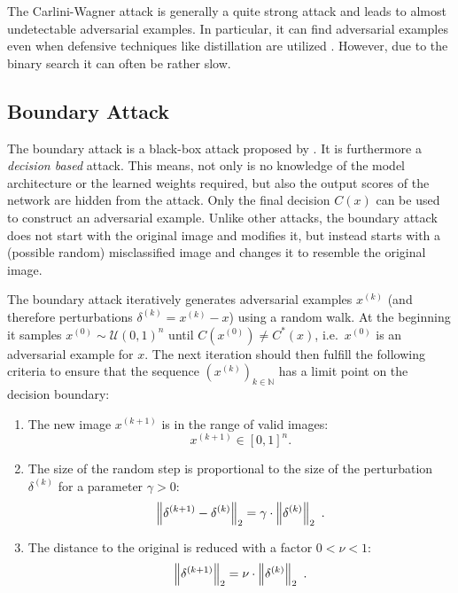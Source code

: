 The Carlini-Wagner attack is generally a quite strong attack and leads to almost undetectable adversarial examples.
In particular, it can find adversarial examples even when defensive techniques like distillation are utilized \citep{carlini}.
However, due to the binary search it can often be rather slow.

\subsection{Boundary Attack}

The boundary attack is a black-box attack proposed by \citet{boundary}. It is furthermore a \emph{decision based} attack. This means, not only is no knowledge of the model architecture or the learned weights required, but also the output scores of the network are hidden from the attack. Only the final decision $C(x)$ can be used to construct an adversarial example.
Unlike other attacks, the boundary attack does not start with the original image and modifies it, but instead starts with a (possible random) misclassified image and changes it to resemble the original image.

The boundary attack iteratively generates adversarial examples $x^{(k)}$ (and therefore perturbations $\delta^{(k)} = x^{(k)} - x$) using a random walk. At the beginning it samples $x^{(0)} \sim \mathcal{U}(0,1)^n$ until $C(x^{(0)}) \neq C^*(x)$, i.e.\ $x^{(0)}$ is an adversarial example for $x$.
The next iteration should then fulfill the following criteria to ensure that the sequence $(x^{(k)})_{k \in \mathbb{N}}$ has a limit point on the decision boundary:

\begin{enumerate}
	\item The new image $x^{(k+1)}$ is in the range of valid images:
	\begin{equation*}
	x^{(k+1)}\in [0,1]^n
	\text{.}
	\end{equation*}
	
	\item The size of the random step is proportional to the size of the perturbation $\delta^{(k)}$ for a parameter $\gamma > 0$:
	\begin{equation*}
	\left \lVert \delta^{(k+1)} - \delta^{(k)} \right \rVert _{2} = \gamma \cdot \left \lVert \delta^{(k)} \right \rVert _{2}
	\text{ .}
	\end{equation*}
	
	\item The distance to the original is reduced with a factor $0<\nu<1$:
	\begin{equation*}
	\left \lVert \delta^{(k+1)} \right \rVert _{2} = \nu \cdot \left \lVert \delta^{(k)} \right \rVert _{2}
	\text{ .}
	\end{equation*}
\end{enumerate}

